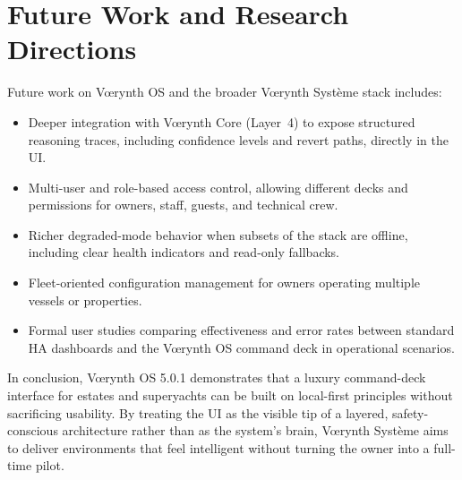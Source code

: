 \documentclass[11pt,a4paper]{article}
\begin{document}
\section{Future Work and Research Directions}

Future work on Vœrynth OS and the broader Vœrynth Système stack includes:
\begin{itemize}[leftmargin=*]
  \item Deeper integration with Vœrynth Core (Layer~4) to expose structured reasoning traces, including confidence levels and revert paths, directly in the UI.
  \item Multi-user and role-based access control, allowing different decks and permissions for owners, staff, guests, and technical crew.
  \item Richer degraded-mode behavior when subsets of the stack are offline, including clear health indicators and read-only fallbacks.
  \item Fleet-oriented configuration management for owners operating multiple vessels or properties.
  \item Formal user studies comparing effectiveness and error rates between standard HA dashboards and the Vœrynth OS command deck in operational scenarios.
\end{itemize}

In conclusion, Vœrynth OS 5.0.1 demonstrates that a luxury command-deck interface for estates and superyachts can be built on local-first principles without sacrificing usability. By treating the UI as the visible tip of a layered, safety-conscious architecture rather than as the system's brain, Vœrynth Système aims to deliver environments that feel intelligent without turning the owner into a full-time pilot.



\end{document}
